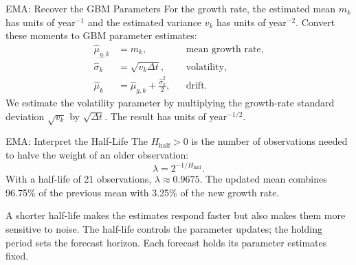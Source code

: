 \documentclass[aspectratio=169,11pt]{beamer}
\begin{document}
\begin{frame}{EMA: Recover the GBM Parameters}
For the growth rate, the estimated mean $m_k$ has units of year$^{-1}$ and
the estimated variance $v_k$ has units of year$^{-2}$. Convert these moments
to GBM parameter estimates:
\[
\begin{aligned}
  \hat\mu_{g,k} &= m_k,
    & &\text{mean growth rate},\\[0.4em]
  \hat\sigma_k &= \sqrt{v_k\Delta t},
    & &\text{volatility},\\[0.4em]
  \hat\mu_k &= \hat\mu_{g,k}+\frac{\hat\sigma_k^2}{2},
    & &\text{drift}.
\end{aligned}
\]
We estimate the volatility parameter by multiplying the growth-rate
standard deviation $\sqrt{v_k}$ by $\sqrt{\Delta t}$. The result has units
of year$^{-1/2}$.

\end{frame}

\begin{frame}{EMA: Interpret the Half-Life}
The  $H_{\mathrm{half}}>0$ is the number of observations
needed to halve the weight of an older observation:
\[
  \lambda=2^{-1/H_{\mathrm{half}}}.
\]
With a half-life of 21 observations, $\lambda\approx0.9675$. The updated
mean combines 96.75\% of the previous mean with 3.25\% of the new growth rate.

\vspace{0.7em}
A shorter half-life makes the estimates respond faster but also makes
them more sensitive to noise. The half-life controls the parameter updates; the holding period
sets the forecast horizon. Each forecast holds its parameter estimates fixed.

\end{frame}
\end{document}
